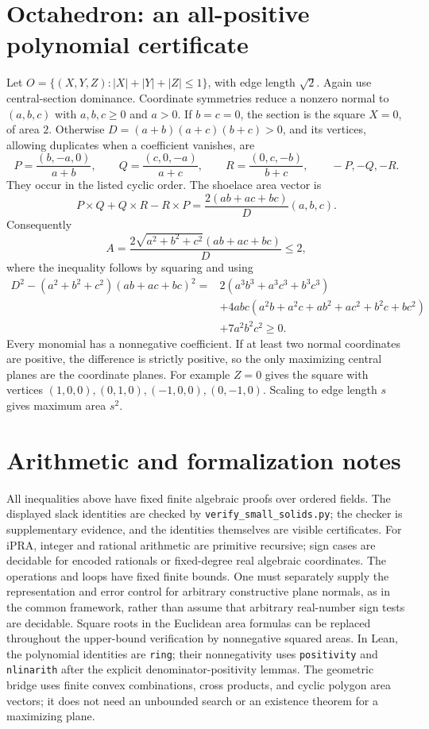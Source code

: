 \section{Octahedron: an all-positive polynomial certificate}
Let $O=\{(X,Y,Z):|X|+|Y|+|Z|\le1\}$, with edge length $\sqrt2$.
Again use central-section dominance.  Coordinate symmetries reduce a
nonzero normal to $(a,b,c)$ with $a,b,c\ge0$ and $a>0$.
If $b=c=0$, the section is the square $X=0$, of area $2$.
Otherwise $D=(a+b)(a+c)(b+c)>0$, and its vertices, allowing duplicates
when a coefficient vanishes, are
\[
 P=\frac{(b,-a,0)}{a+b},\qquad
 Q=\frac{(c,0,-a)}{a+c},\qquad
 R=\frac{(0,c,-b)}{b+c},\qquad -P,-Q,-R.
\]
They occur in the listed cyclic order.  The shoelace area vector is
\[
 P\times Q+Q\times R-R\times P
 =\frac{2(ab+ac+bc)}D(a,b,c).
\]
Consequently
\[
 A=\frac{2\sqrt{a^2+b^2+c^2}(ab+ac+bc)}D\le2,
\]
where the inequality follows by squaring and using
\begin{align*}
 D^2-(a^2+b^2+c^2)(ab+ac+bc)^2
 ={}&2(a^3b^3+a^3c^3+b^3c^3)\\
 &+4abc(a^2b+a^2c+ab^2+ac^2+b^2c+bc^2)\\
 &+7a^2b^2c^2\ge0.
\end{align*}
Every monomial has a nonnegative coefficient.  If at least two normal
coordinates are positive, the difference is strictly positive, so the
only maximizing central planes are the coordinate planes.
For example $Z=0$ gives the square with vertices
$(1,0,0),(0,1,0),(-1,0,0),(0,-1,0)$.
Scaling to edge length $s$ gives maximum area $s^2$.

\section{Arithmetic and formalization notes}
All inequalities above have fixed finite algebraic proofs over ordered
fields.  The displayed slack identities are checked by
\texttt{verify\_small\_solids.py}; the checker is supplementary evidence,
and the identities themselves are visible certificates.
For iPRA, integer and rational arithmetic are primitive recursive;
sign cases are decidable for encoded rationals or fixed-degree real
algebraic coordinates.  The operations and loops have fixed finite
bounds.  One must separately supply the representation and error
control for arbitrary constructive plane normals, as in the common
framework, rather than assume that arbitrary real-number sign tests
are decidable.  Square roots in the Euclidean area formulas can be
replaced throughout the upper-bound verification by nonnegative squared
areas.  In Lean, the polynomial identities are \texttt{ring}; their
nonnegativity uses \texttt{positivity} and \texttt{nlinarith} after the
explicit denominator-positivity lemmas.  The geometric bridge uses
finite convex combinations, cross products, and cyclic polygon area
vectors; it does not need an unbounded search or an existence theorem
for a maximizing plane.


